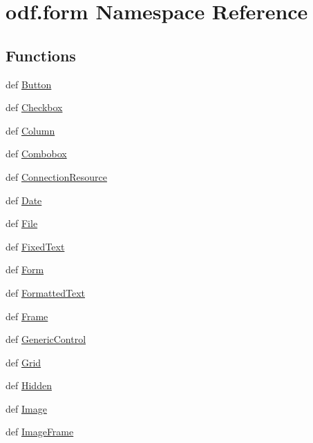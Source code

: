 \hypertarget{namespaceodf_1_1form}{\section{odf.\+form Namespace Reference}
\label{namespaceodf_1_1form}
}
\subsection*{Functions}
\begin{DoxyCompactItemize}
\item 
def \hyperlink{namespaceodf_1_1form_a652dde13416c6041306536a6c0df8bb7}{Button}
\item 
def \hyperlink{namespaceodf_1_1form_a2a2d0201fda6ada48c02ff66de84ed70}{Checkbox}
\item 
def \hyperlink{namespaceodf_1_1form_ada737ba79b60b21fe7150b59aacc90b6}{Column}
\item 
def \hyperlink{namespaceodf_1_1form_a96b747cf3beceb339a7c26bfe9115107}{Combobox}
\item 
def \hyperlink{namespaceodf_1_1form_a86b346c4da24384a61a00bfcc125a8f3}{Connection\+Resource}
\item 
def \hyperlink{namespaceodf_1_1form_aa70310d641c27104cf55cc04963af19a}{Date}
\item 
def \hyperlink{namespaceodf_1_1form_ac9063421d76e60c9f8f4f2f3e2c4da31}{File}
\item 
def \hyperlink{namespaceodf_1_1form_adf2d931853cbd8f4ff6d586499c60faf}{Fixed\+Text}
\item 
def \hyperlink{namespaceodf_1_1form_a91d5b4d72a09e9b115a1cfe441ecacd7}{Form}
\item 
def \hyperlink{namespaceodf_1_1form_a5b88a0820f08ff8b50cd6c2cc8ad9b0c}{Formatted\+Text}
\item 
def \hyperlink{namespaceodf_1_1form_a82a19e3a12817bfaa2f8842387413082}{Frame}
\item 
def \hyperlink{namespaceodf_1_1form_afec8e57920eb45eca1b989d22ebb2f1c}{Generic\+Control}
\item 
def \hyperlink{namespaceodf_1_1form_a4e5cb7e44914b108e06fb9c77b0b2b52}{Grid}
\item 
def \hyperlink{namespaceodf_1_1form_af5561345d3117b0d9f1fb467430a790b}{Hidden}
\item 
def \hyperlink{namespaceodf_1_1form_a96b63942b9bc971dc5c114710544f6b4}{Image}
\item 
def \hyperlink{namespaceodf_1_1form_af87607e975ecda46d82bb5594e135e5c}{Image\+Frame}

\end{DoxyCompactItemize}
